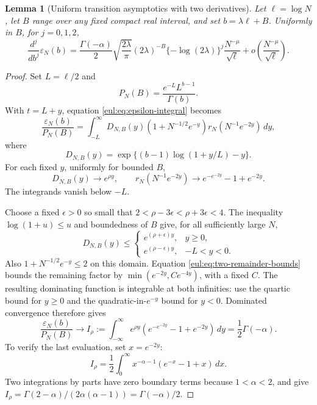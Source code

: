 \documentclass[11pt]{article}
\numberwithin{equation}{section}
\newtheorem{lemma}[theorem]{Lemma}
\theoremstyle{definition}
\theoremstyle{remark}
\begin{document}
\begin{lemma}[Uniform transition asymptotics with two derivatives]
\label{eul:lem:transition-C2}
Let $\ell=\log N$, let $B$ range over any fixed compact real interval,
and set $b=\lambda\ell+B$.  Uniformly in $B$, for $j=0,1,2$,
\begin{equation}\label{eul:eq:epsilon-C2}
 \frac{d^j}{db^j}\varepsilon_N(b)
 =\frac{\Gamma(-\alpha)}2\sqrt{\frac{2\lambda}{\pi}}
  (2\lambda)^{-B}\{-\log(2\lambda)\}^{j}
  \frac{N^{-\mu}}{\sqrt\ell}
  +o\!\left(\frac{N^{-\mu}}{\sqrt\ell}\right).
\end{equation}
\end{lemma}
\begin{proof}
Set $L=\ell/2$ and
\[
 P_N(B)=\frac{e^{-L}L^{b-1}}{\Gamma(b)}.
\]
With $t=L+y$, equation \eqref{eul:eq:epsilon-integral} becomes
\begin{equation}\label{eul:eq:transition-rescaling}
 \frac{\varepsilon_N(b)}{P_N(B)}
 =\int_{-L}^\infty D_{N,B}(y)
       (1+N^{-1/2}e^{-y})r_N(N^{-1}e^{-2y})\,dy,
\end{equation}
where
\[
 D_{N,B}(y)=
  \exp\{(b-1)\log(1+y/L)-y\}.
\]
For each fixed $y$, uniformly for bounded $B$,
\[
 D_{N,B}(y)\longrightarrow e^{\rho y},\qquad
 r_N(N^{-1}e^{-2y})\longrightarrow
              e^{-e^{-2y}}-1+e^{-2y}.
\]
The integrands vanish below $-L$.

Choose a fixed $\epsilon>0$ so small that
$2<\rho-3\epsilon<\rho+3\epsilon<4$.
The inequality $\log(1+u)\leq u$ and boundedness of $B$ give, for
all sufficiently large $N$,
\[
 D_{N,B}(y)\leq
 \begin{cases}
   e^{(\rho+\epsilon)y},&y\geq0,\\
   e^{(\rho-\epsilon)y},&-L<y<0.
 \end{cases}
\]
Also $1+N^{-1/2}e^{-y}\leq2$ on this domain.  Equation
\eqref{eul:eq:two-remainder-bounds} bounds the remaining factor by
$\min(e^{-2y},C e^{-4y})$, with a fixed $C$.
The resulting dominating function is integrable at both infinities:
use the quartic bound for $y\geq0$ and the quadratic-in-$e^{-y}$
bound for $y<0$.  Dominated convergence therefore gives
\begin{equation}\label{eul:eq:Mellin-limit}
 \frac{\varepsilon_N(b)}{P_N(B)}
 \longrightarrow
 I_\rho:=\int_{-\infty}^{\infty}
      e^{\rho y}(e^{-e^{-2y}}-1+e^{-2y})\,dy
 =\frac12\Gamma(-\alpha).
\end{equation}
To verify the last evaluation, set $x=e^{-2y}$:
\[
 I_\rho=\frac12\int_0^\infty
          x^{-\alpha-1}(e^{-x}-1+x)\,dx.
\]
Two integrations by parts have zero boundary terms because
$1<\alpha<2$, and give
$I_\rho=\Gamma(2-\alpha)/(2\alpha(\alpha-1))
       =\Gamma(-\alpha)/2$.


\end{proof}
\end{document}

